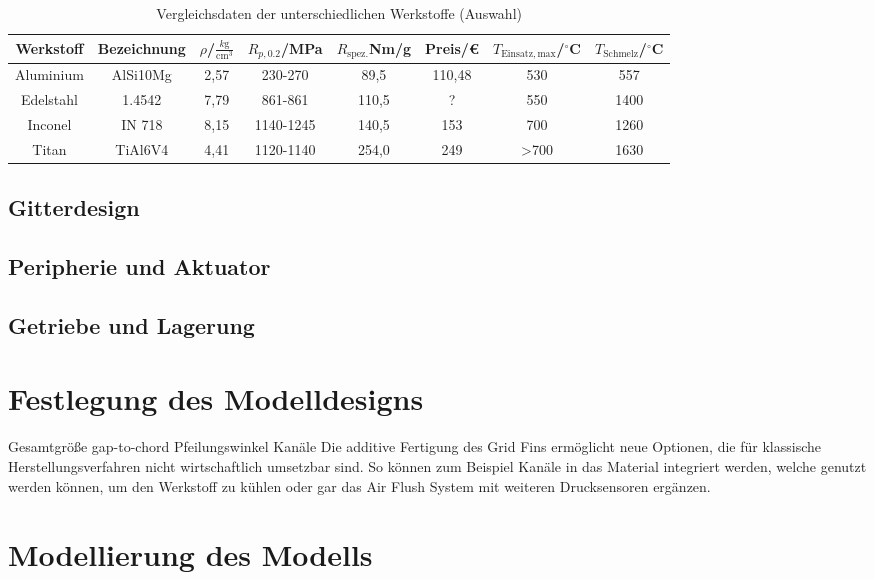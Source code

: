 \begin{table}[h] 
	\centering 
	\begin{tabular}{c|c|c|c|c|c|c|c} 
		Werkstoff&Bezeichnung&$\rho$/$\frac{k\mathrm{g}}{\mathrm{cm}^3}$&$R_{p,0.2}$/MPa&$R_\mathrm{spez.}$Nm/g&Preis/€&$T_\mathrm{Einsatz, max}$/$^\circ$C&$T_\mathrm{Schmelz}$/$^\circ$C\\ 
		\hline 
		Aluminium&AlSi10Mg&2,57&230-270&89,5&110,48&530&557\\ 
		Edelstahl&1.4542&7,79&861-861&110,5&?&550&1400\\ 
		Inconel&IN 718&8,15&1140-1245&140,5&153&700&1260\\ 
		Titan&TiAl6V4&4,41&1120-1140&254,0&249&>700&1630\\ 
	\end{tabular} 
	\begin{flushright} 
	\end{flushright} 
	\caption{Vergleichsdaten der unterschiedlichen Werkstoffe (Auswahl)}
	\label{tab_WerkstoffeKlein}
\end{table}  


\subsection{Gitterdesign}
\subsection{Peripherie und Aktuator}
\subsection{Getriebe und Lagerung}

\section{Festlegung des Modelldesigns}\label{sec:modelldesign}
Gesamtgröße
gap-to-chord
Pfeilungswinkel
Kanäle
Die additive Fertigung des Grid Fins ermöglicht neue Optionen, die für klassische Herstellungsverfahren nicht wirtschaftlich umsetzbar sind. So können zum Beispiel Kanäle in das Material integriert werden, welche genutzt werden können, um den Werkstoff zu kühlen oder gar das Air Flush System mit weiteren Drucksensoren ergänzen.

\section{Modellierung des Modells}